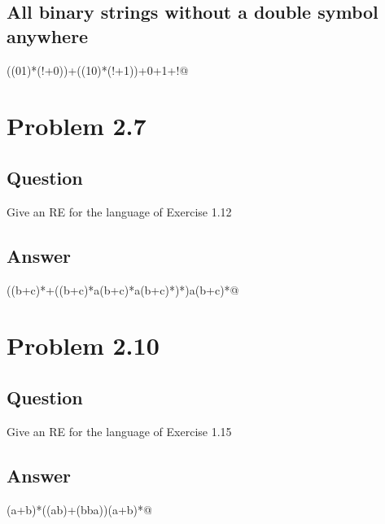 \documentclass[12pt, a4paper]{article}
\begin{document}
\subsection{All binary strings without a double symbol anywhere}
\begin{center}
\verb@((01)*(!+0))+((10)*(!+1))+0+1+!@
\end{center}

\section{Problem 2.7}
\subsection{Question}
Give an RE for the language of Exercise 1.12
\subsection{Answer}
\begin{center}
\verb@((b+c)*+((b+c)*a(b+c)*a(b+c)*)*)a(b+c)*@
\end{center}

\section{Problem 2.10}
\subsection{Question}
Give an RE for the language of Exercise 1.15
\subsection{Answer}
\begin{center}
\verb@(a+b)*((ab)+(bba))(a+b)*@
\end{center} 	
\end{document}
